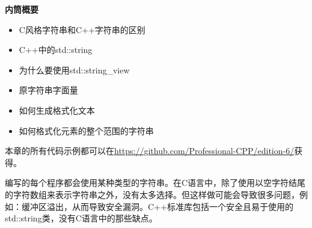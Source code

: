 \noindent
\textbf{内筒概要}

\begin{itemize}
\item
C风格字符串和C++字符串的区别

\item
C++中的std::string

\item
为什么要使用std::string\_view

\item
原字符串字面量

\item
如何生成格式化文本

\item
如何格式化元素的整个范围的字符串
\end{itemize}


本章的所有代码示例都可以在\url{https://github.com/Professional-CPP/edition-6/}获得。

编写的每个程序都会使用某种类型的字符串。在C语言中，除了使用以空字符结尾的字符数组来表示字符串之外，没有太多选择。但这样做可能会导致很多问题，例如：缓冲区溢出，从而导致安全漏洞。C++标准库包括一个安全且易于使用的std::string类，没有C语言中的那些缺点。














